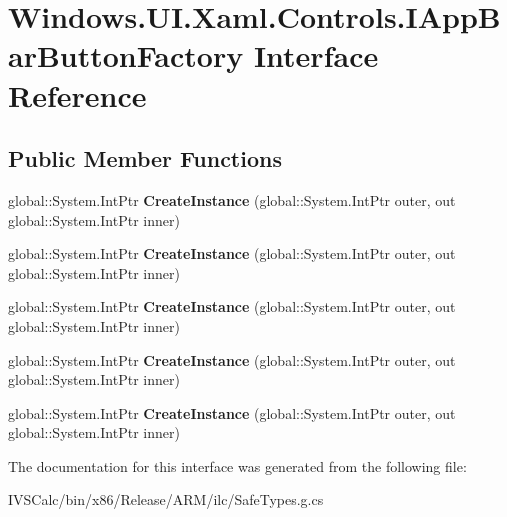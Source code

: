 \hypertarget{interface_windows_1_1_u_i_1_1_xaml_1_1_controls_1_1_i_app_bar_button_factory}{}\section{Windows.\+U\+I.\+Xaml.\+Controls.\+I\+App\+Bar\+Button\+Factory Interface Reference}
\label{interface_windows_1_1_u_i_1_1_xaml_1_1_controls_1_1_i_app_bar_button_factory}
\subsection*{Public Member Functions}
\begin{DoxyCompactItemize}
\item 
\mbox{\label{interface_windows_1_1_u_i_1_1_xaml_1_1_controls_1_1_i_app_bar_button_factory_af818f8b1fa8d06dce3d1a2d487d8f212}} 
global\+::\+System.\+Int\+Ptr {\bfseries Create\+Instance} (global\+::\+System.\+Int\+Ptr outer, out global\+::\+System.\+Int\+Ptr inner)
\item 
\mbox{\label{interface_windows_1_1_u_i_1_1_xaml_1_1_controls_1_1_i_app_bar_button_factory_af818f8b1fa8d06dce3d1a2d487d8f212}} 
global\+::\+System.\+Int\+Ptr {\bfseries Create\+Instance} (global\+::\+System.\+Int\+Ptr outer, out global\+::\+System.\+Int\+Ptr inner)
\item 
\mbox{\label{interface_windows_1_1_u_i_1_1_xaml_1_1_controls_1_1_i_app_bar_button_factory_af818f8b1fa8d06dce3d1a2d487d8f212}} 
global\+::\+System.\+Int\+Ptr {\bfseries Create\+Instance} (global\+::\+System.\+Int\+Ptr outer, out global\+::\+System.\+Int\+Ptr inner)
\item 
\mbox{\label{interface_windows_1_1_u_i_1_1_xaml_1_1_controls_1_1_i_app_bar_button_factory_af818f8b1fa8d06dce3d1a2d487d8f212}} 
global\+::\+System.\+Int\+Ptr {\bfseries Create\+Instance} (global\+::\+System.\+Int\+Ptr outer, out global\+::\+System.\+Int\+Ptr inner)
\item 
\mbox{\label{interface_windows_1_1_u_i_1_1_xaml_1_1_controls_1_1_i_app_bar_button_factory_af818f8b1fa8d06dce3d1a2d487d8f212}} 
global\+::\+System.\+Int\+Ptr {\bfseries Create\+Instance} (global\+::\+System.\+Int\+Ptr outer, out global\+::\+System.\+Int\+Ptr inner)
\end{DoxyCompactItemize}


The documentation for this interface was generated from the following file\+:\begin{DoxyCompactItemize}
\item 
I\+V\+S\+Calc/bin/x86/\+Release/\+A\+R\+M/ilc/Safe\+Types.\+g.\+cs\end{DoxyCompactItemize}

